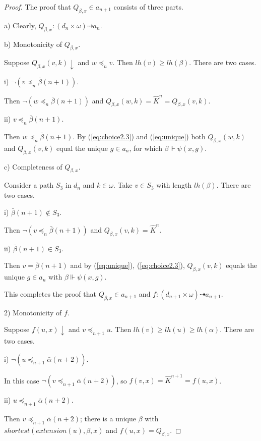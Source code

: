\documentclass{asl}
\theoremstyle{definition}
\begin{document}
\begin{proof}
The proof that $Q_{\beta,x}\in a_{n+1}$ consists of three parts.
\smallskip

a) Clearly, $Q_{\beta,x}:(d_n\times\omega)\dashrightarrow a_n$.
\smallskip

b) Monotonicity of $Q_{\beta,x}$.

Suppose $Q_{\beta,x}(v,k)\downarrow$ and $w\preccurlyeq_nv$. Then $lh(v)\geqslant lh(\beta)$. There are two cases.
\smallskip

i) $\neg(v\preccurlyeq_n \bar{\beta}(n+1))$.

Then $\neg(w\preccurlyeq_n \bar{\beta}(n+1))$ and $Q_{\beta,x}(w,k)=\widehat{K}^n=Q_{\beta,x}(v,k)$.
\smallskip

ii) $v\preccurlyeq_n \bar{\beta}(n+1)$.

Then $w\preccurlyeq_n \bar{\beta}(n+1)$. By (\ref{eq:choice2.3}) and (\ref{eq:unique}) both $Q_{\beta,x}(w,k)$ and $Q_{\beta,x}(v,k)$ equal the unique $g\in a_n$, for which $\beta\Vdash \psi(x,g)$.

c) Completeness of $Q_{\beta,x}$.

Consider a path $S_3$ in $d_n$ and $k\in \omega$. Take $v\in S_3$ with length $lh(\beta)$. There are two cases.

i) $\bar{\beta}(n+1)\notin S_3$.

Then $\neg(v\preccurlyeq_n \bar{\beta}(n+1))$ and $Q_{\beta,x}(v,k)=\widehat{K}^n$.
\smallskip

ii) $\bar{\beta}(n+1)\in S_3$.

Then $v=\bar{\beta}(n+1) $ and by (\ref{eq:unique}), (\ref{eq:choice2.3}), $Q_{\beta,x}(v,k)$ equals the unique $g\in a_n$ with $\beta\Vdash \psi(x,g)$.

This completes the proof that $Q_{\beta,x}\in a_{n+1}$ and  $f:(d_{n+1}\times\omega)\dashrightarrow a_{n+1}$.

2) Monotonicity of $f$.

Suppose $f(u,x)\downarrow$ and $v\preccurlyeq_{n+1} u$. Then $lh(v)\geqslant lh(u)\geqslant lh(\alpha)$. There are two cases.

i) $\neg(u\preccurlyeq_{n+1}\bar{\alpha}({n+2}))$.

In this case $\neg(v\preccurlyeq_{n+1}\bar{\alpha}({n+2}))$, so $f(v,x)=\widehat{K}^{n+1}=f(u,x)$.
\smallskip

ii) $u\preccurlyeq_{n+1}\bar{\alpha}({n+2})$.
\smallskip

Then $v\preccurlyeq_{n+1} \bar{\alpha}({n+2})$; there is a unique $\beta$ with $shortest(extension(u),\beta,x)$ and $f(u,x)=Q_{\beta,x}$.
\smallskip


\end{proof}
\end{document}
